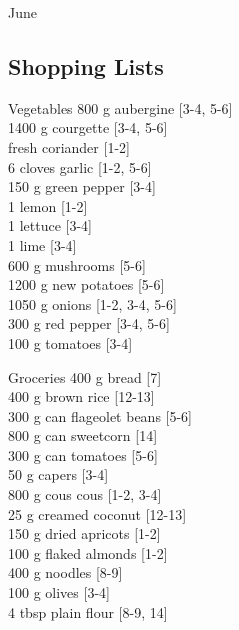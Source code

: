 \begin{menu}{June}
    \subsection*{Shopping Lists}
      \begin{shoppinglist}{Vegetables}
      800 g aubergine {\scriptsize[3-4, 5-6]}\\
      1400 g courgette {\scriptsize[3-4, 5-6]}\\
       fresh coriander {\scriptsize[1-2]}\\
      6 cloves garlic {\scriptsize[1-2, 5-6]}\\
      150 g green pepper {\scriptsize[3-4]}\\
      1  lemon {\scriptsize[1-2]}\\
      1  lettuce {\scriptsize[3-4]}\\
      1  lime {\scriptsize[3-4]}\\
      600 g mushrooms {\scriptsize[5-6]}\\
      1200 g new potatoes {\scriptsize[5-6]}\\
      1050 g onions {\scriptsize[1-2, 3-4, 5-6]}\\
      300 g red pepper {\scriptsize[3-4, 5-6]}\\
      100 g tomatoes {\scriptsize[3-4]}\\
      \end{shoppinglist}%
      \begin{shoppinglist}{Groceries}
      400 g bread {\scriptsize[7]}\\
      400 g brown rice {\scriptsize[12-13]}\\
      300 g can flageolet beans {\scriptsize[5-6]}\\
      800 g can sweetcorn {\scriptsize[14]}\\
      300 g can tomatoes {\scriptsize[5-6]}\\
      50 g capers {\scriptsize[3-4]}\\
      800 g cous cous {\scriptsize[1-2, 3-4]}\\
      25 g creamed coconut {\scriptsize[12-13]}\\
      150 g dried apricots {\scriptsize[1-2]}\\
      100 g flaked almonds {\scriptsize[1-2]}\\
      400 g noodles {\scriptsize[8-9]}\\
      100 g olives {\scriptsize[3-4]}\\
      4 tbsp plain flour {\scriptsize[8-9, 14]}\\

\end{shoppinglist}
\end{menu}
